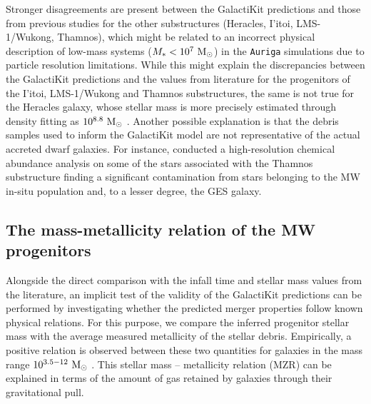 Stronger disagreements are present between the GalactiKit predictions and those from previous studies for the other substructures (Heracles, I'itoi, LMS-1/Wukong, Thamnos), which might be related to an incorrect physical description of low-mass systems ($M_{*}<10^{7}~\rm{M}_{\odot}$) in the \texttt{Auriga} simulations due to particle resolution limitations. While this might explain the discrepancies between the GalactiKit predictions and the values from literature for the progenitors of the I'itoi, LMS-1/Wukong and Thamnos substructures, the same is not true for the Heracles galaxy, whose stellar mass is more precisely estimated through density fitting as $10^{8.8}~\rm{M}_{\odot}$ \citep{Horta2025}. Another possible explanation is that the debris samples used to inform the GalactiKit model are not representative of the actual accreted dwarf galaxies. For instance, \citet{Ceccarelli2025} conducted a high-resolution chemical abundance analysis on some of the stars associated with the Thamnos substructure finding a significant contamination from stars belonging to the MW in-situ population and, to a lesser degree, the GES galaxy. 

\subsection{The mass-metallicity relation of the MW progenitors}

Alongside the direct comparison with the infall time and stellar mass values from the literature, an implicit test of the validity of the GalactiKit predictions can be performed by investigating whether the predicted merger properties follow known physical relations. For this purpose, we compare the inferred progenitor stellar mass with the average measured metallicity of the stellar debris. Empirically, a positive relation is observed between these two quantities for galaxies in the mass range $10^{3.5-12}~\rm{M}_{\odot}$ \citep{Kirby2013}. This stellar mass -- metallicity relation (MZR) can be explained in terms of the amount of gas retained by galaxies through their gravitational pull. 

